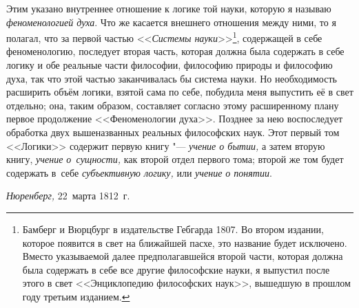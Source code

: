 Этим указано внутреннее отношение к логике той науки, которую я называю
{\em феноменологией духа}. Что же касается внешнего отношения между ними, то я
полагал, что за первой частью <<{\em Системы науки}>>\footnote{Бамберг и
Вюрцбург в издательстве Гебгарда 1807. Во втором издании, которое появится в
свет на ближайшей пасхе, это название будет исключено. Вместо указываемой далее
предполагавшейся второй части, которая должна была содержать в себе все другие
философские науки, я выпустил после этого в свет <<Энциклопедию философских
наук>>, вышедшую в прошлом году третьим изданием.}, содержащей в себе
феноменологию, последует вторая часть, которая должна была содержать в себе
логику и обе реальные части философии, философию природы и философию духа, так
что этой частью заканчивалась бы система науки. Но необходимость расширить
объём логики, взятой сама по себе, побудила меня выпустить её в свет отдельно;
она, таким образом, составляет согласно этому расширенному плану первое
продолжение <<Феноменологии духа>>. Позднее за нею воспоследует обработка двух
вышеназванных реальных философских наук. Этот первый том <<Логики>> содержит
первую книгу "--- {\em учение о бытии,} а затем вторую книгу,
{\em учение о~сущности,} как второй отдел первого тома; второй же том будет
содержать в~себе {\em субъективную логику,} или {\em учение о понятии}.

{\em Нюренберг,} 22~марта 1812~г.
